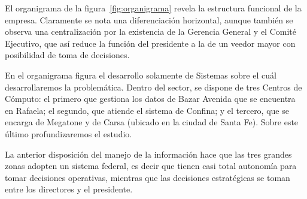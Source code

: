 El organigrama de la figura~\ref{fig:organigrama} revela la estructura
funcional de la empresa.  Claramente se nota una diferenciación horizontal,
aunque también se observa una centralización  por la existencia de la Gerencia
General y el Comité Ejecutivo, que así reduce la función del presidente a la de
un veedor mayor con posibilidad de toma de decisiones.

En el organigrama figura el desarrollo solamente de Sistemas sobre el cuál
desarrollaremos la problemática. Dentro del sector, se dispone de tres Centros
de Cómputo: el primero que gestiona los datos de Bazar Avenida que se encuentra
en Rafaela; el segundo, que atiende el sistema de Confina; y el tercero, que se
encarga de Megatone y de Carsa (ubicado en la ciudad de Santa Fe). Sobre este
último profundizaremos el estudio.

La anterior disposición del manejo de la información hace que las tres grandes
zonas adopten un sistema federal, es decir que tienen casi total autonomía para
tomar decisiones operativas, mientras que las decisiones estratégicas se toman
entre los directores y el presidente.


